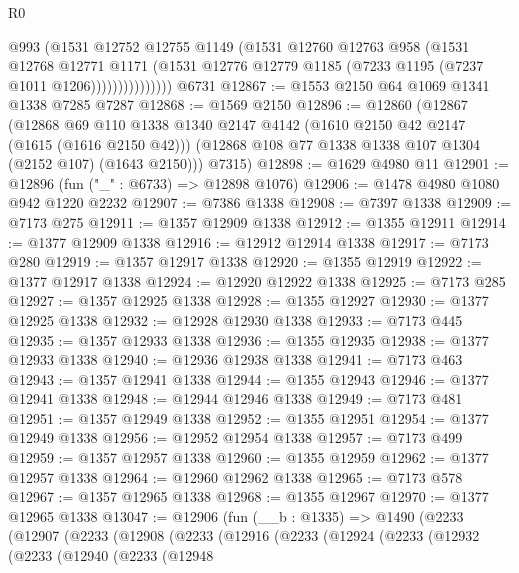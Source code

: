\begin{lexlean}{R0}
\begin{coremodule}
                      @993
                      (@1531
                        @12752
                        @12755
                        @1149
                        (@1531
                          @12760
                          @12763
                          @958
                          (@1531
                            @12768
                            @12771
                            @1171
                            (@1531
                              @12776
                              @12779
                              @1185
                              (@7233 @1195 (@7237 @1011 @1206)))))))))))))))
    @6731
@12867 := @1553 @2150 @64 @1069 @1341 @1338 @7285 @7287
@12868 := @1569 @2150
@12896 := @12860
    (@12867
      (@12868
        @69
        @110
        @1338
        @1340
        @2147
        @4142
        (@1610 @2150 @42 @2147 (@1615 (@1616 @2150 @42)))
        (@12868 @108 @77 @1338 @1338 @107 @1304 (@2152 @107) (@1643 @2150)))
      @7315)
@12898 := @1629 @4980 @11
@12901 := @12896 (fun ("_" : @6733) => @12898 @1076)
@12906 := @1478 @4980 @1080 @942 @1220 @2232
@12907 := @7386 @1338
@12908 := @7397 @1338
@12909 := @7173 @275
@12911 := @1357 @12909 @1338
@12912 := @1355 @12911
@12914 := @1377 @12909 @1338
@12916 := @12912 @12914 @1338
@12917 := @7173 @280
@12919 := @1357 @12917 @1338
@12920 := @1355 @12919
@12922 := @1377 @12917 @1338
@12924 := @12920 @12922 @1338
@12925 := @7173 @285
@12927 := @1357 @12925 @1338
@12928 := @1355 @12927
@12930 := @1377 @12925 @1338
@12932 := @12928 @12930 @1338
@12933 := @7173 @445
@12935 := @1357 @12933 @1338
@12936 := @1355 @12935
@12938 := @1377 @12933 @1338
@12940 := @12936 @12938 @1338
@12941 := @7173 @463
@12943 := @1357 @12941 @1338
@12944 := @1355 @12943
@12946 := @1377 @12941 @1338
@12948 := @12944 @12946 @1338
@12949 := @7173 @481
@12951 := @1357 @12949 @1338
@12952 := @1355 @12951
@12954 := @1377 @12949 @1338
@12956 := @12952 @12954 @1338
@12957 := @7173 @499
@12959 := @1357 @12957 @1338
@12960 := @1355 @12959
@12962 := @1377 @12957 @1338
@12964 := @12960 @12962 @1338
@12965 := @7173 @578
@12967 := @1357 @12965 @1338
@12968 := @1355 @12967
@12970 := @1377 @12965 @1338
@13047 := @12906
    (fun (__b : @1335) =>
    @1490
      (@2233
        (@12907
          (@2233
            (@12908
              (@2233
                (@12916
                  (@2233
                    (@12924
                      (@2233
                        (@12932
                          (@2233
                            (@12940
                              (@2233
                                (@12948

\end{coremodule}
\end{lexlean}
